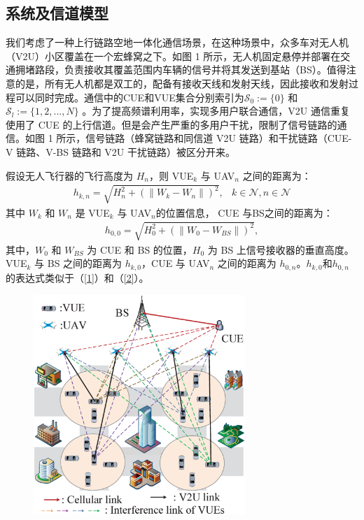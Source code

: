 \subsection{系统及信道模型}\label{section2-2-1}
我们考虑了一种上行链路空地一体化通信场景，在这种场景中，众多车对无人机（V2U）小区覆盖在一个宏蜂窝之下。如图 1 所示，无人机固定悬停并部署在交通拥堵路段，负责接收其覆盖范围内车辆的信号并将其发送到基站（BS）。值得注意的是，所有无人机都是双工的，配备有接收天线和发射天线，因此接收和发射过程可以同时完成。通信中的CUE和VUE集合分别索引为$\mathcal{S}_0:= \{0\}$ 和$\mathcal{S}_l:=\{1, 2,..., N\}$ 。为了提高频谱利用率，实现多用户联合通信，V2U 通信重复使用了 CUE 的上行信道。但是会产生严重的多用户干扰，限制了信号链路的通信。如图 1 所示，信号链路（蜂窝链路和同信道 V2U 链路）和干扰链路（CUE-V 链路、V-BS 链路和 V2U 干扰链路）被区分开来。

假设无人飞行器的飞行高度为 $H_n$，则 VUE$_{k}$ 与 UAV$_{n}$ 之间的距离为：
\begin{eqnarray}\label{1}
h_{k,n}=\sqrt{H_n^2+(\|W_k-W_n\|)^2},           &k\in \mathcal{N}, n\in \mathcal{N}
\end{eqnarray}
其中 $W_k$ 和 $W_n$ 是 VUE$_{k}$ 与 UAV$_{n}$的位置信息，  CUE 与BS之间的距离为：
\begin{eqnarray}\label{2}
h_{0,0}=\sqrt{H_0^2+(\|W_0-W_{BS}\|)^2},
\end{eqnarray}
其中，$W_0$ 和 $W_{BS}$ 为 CUE 和 BS 的位置，$H_0$ 为 BS 上信号接收器的垂直高度。VUE$_{k}$ 与 BS 之间的距离为 $h_{k,0}$，CUE 与 UAV$_{n}$ 之间的距离为 $h_{0,n}$。$h_{k,0}$和$h_{0,n}$的表达式类似于（\ref{1}）和（\ref{2}）。
\begin{figure}[htbp]
\centerline{\includegraphics[width=8cm]{figures//chap2//1.eps}}
\end{figure}

